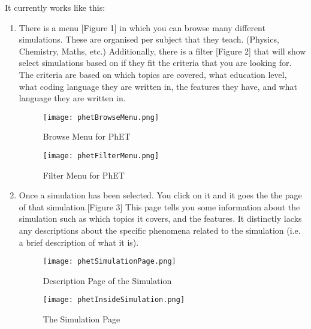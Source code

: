 \documentclass[12pt]{article}
\begin{document}
It currently works like this:
\setlength\itemsep{-0.25em}
\begin{enumerate}
    \item There is a menu [Figure 1] in which you can browse many different simulations. These are organised per subject that they teach. (Physics, Chemistry, Maths, etc.) Additionally, there is a filter [Figure 2] that will show select simulations based on if they fit the criteria that you are looking for. The criteria are based on which topics are covered, what education level, what coding language they are written in, the features they have, and what language they are written in.
    
\begin{figure}[!htb]
   \begin{minipage}{0.48\textwidth}
     \centering
     \texttt{[image: phetBrowseMenu.png]}
     \caption{Browse Menu for PhET}\label{Fig:Figure 1}
   \end{minipage}\hfill
   \begin{minipage}{0.48\textwidth}
     \centering
     \texttt{[image: phetFilterMenu.png]}
     \caption{Filter Menu for PhET}\label{Fig:Figure 2}
   \end{minipage}
\end{figure}




\newpage
    \item Once a simulation has been selected. You click on it and it goes the the page of that simulation.[Figure 3] This page tells you some information about the simulation such as which topics it covers, and the features. It distinctly lacks any descriptions about the specific phenomena related to the simulation (i.e. a brief description of what it is).

\begin{figure}[!htb]
   \begin{minipage}{0.48\textwidth}
     \centering
     \texttt{[image: phetSimulationPage.png]}
     \caption{Description Page of the Simulation}\label{Fig:Figure 3}
   \end{minipage}\hfill
   \begin{minipage}{0.48\textwidth}
     \centering
     \texttt{[image: phetInsideSimulation.png]}
     \caption{The Simulation Page}\label{Fig:Figure 4}
   \end{minipage}
\end{figure}


\end{enumerate}
\end{document}

